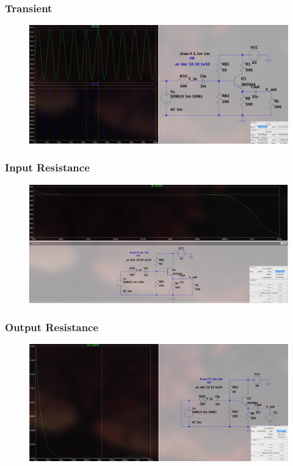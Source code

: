 \documentclass{article}
\begin{document}
\subsubsection{Transient}
\begin{figure}[h!]
        \centering
        \includegraphics[width=0.7\linewidth]{figs/bjt_cc_tr.png}
    \end{figure}
            \pagebreak
\subsubsection{Input Resistance}
\begin{figure}[h!]
        \centering
        \includegraphics[width=0.7\linewidth]{figs/bjt_cc_rin.png}
    \end{figure}
\subsubsection{Output Resistance}
\begin{figure}[h!]
        \centering
        \includegraphics[width=0.7\linewidth]{figs/bjt_cc_rout.png}
    \end{figure}
\end{document}
